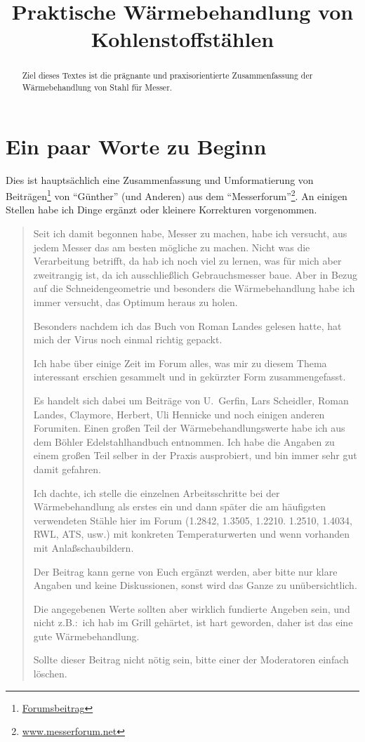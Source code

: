 \documentclass[a4paper]{scrartcl} %
\begin{document}
\title{Praktische Wärmebehandlung von Kohlenstoffstählen}
\maketitle

\begin{abstract}Ziel dieses Textes ist die prägnante und praxisorientierte Zusammenfassung der Wärmebehandlung von Stahl für Messer.\end{abstract}

\tableofcontents
\newpage
\section{Ein paar Worte zu Beginn}
Dies ist hauptsächlich eine Zusammenfassung und Umformatierung von Beiträgen\footnote{\href{http://www.messerforum.net/showthread.php?26645-Zusammenfassung-W\%E4rmebehandlung&highlight=Normalisieren}{Forumsbeitrag}} von ``Günther'' (und Anderen) aus dem ``Messerforum''\footnote{\href{http://www.messerforum.net}{www.messerforum.net}}. An einigen Stellen habe ich Dinge ergänzt oder kleinere Korrekturen vorgenommen.
\begin{quote}
Seit ich damit begonnen habe, Messer zu machen, habe ich versucht, aus jedem Messer das am besten mögliche zu machen.
Nicht was die Verarbeitung betrifft, da hab ich noch viel zu lernen, was für mich aber zweitrangig ist, da ich ausschließlich Gebrauchsmesser baue.
Aber in Bezug auf die Schneidengeometrie und besonders die Wärmebehandlung habe ich immer versucht, das Optimum heraus zu holen.

Besonders nachdem ich das Buch von Roman Landes gelesen hatte, hat mich der Virus noch einmal richtig gepackt.

Ich habe über einige Zeit im Forum alles, was mir zu diesem Thema interessant erschien gesammelt und in gekürzter Form zusammengefasst.

Es handelt sich dabei um Beiträge von U.\ Gerfin, Lars Scheidler, Roman Landes, Claymore, Herbert, Uli Hennicke und noch einigen anderen Forumiten.
Einen großen Teil der Wärmebehandlungswerte habe ich aus dem Böhler Edelstahlhandbuch entnommen.
Ich habe die Angaben zu einem großen Teil selber in der Praxis ausprobiert, und bin immer sehr gut damit gefahren.

Ich dachte, ich stelle die einzelnen Arbeitsschritte bei der Wärmebehandlung als erstes ein und dann später die am häufigsten verwendeten Stähle hier im Forum (1.2842, 1.3505, 1.2210. 1.2510, 1.4034, RWL, ATS, usw.) mit konkreten Temperaturwerten und wenn vorhanden mit Anlaßschaubildern.

Der Beitrag kann gerne von Euch ergänzt werden, aber bitte nur klare Angaben und keine Diskussionen, sonst wird das Ganze zu unübersichtlich.

Die angegebenen Werte sollten aber wirklich fundierte Angeben sein, und nicht z.B.:\ ich hab im Grill gehärtet, ist hart geworden, daher ist das eine gute Wärmebehandlung.

Sollte dieser Beitrag nicht nötig sein, bitte einer der Moderatoren einfach löschen. 
\end{quote}
\end{document}
